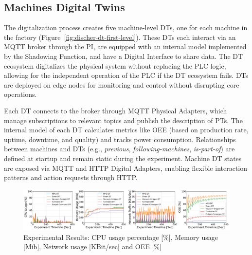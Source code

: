 


\subsection{Machines Digital Twins}
\label{subsec:dt-machine-level} 

The digitalization process creates five machine-level DTs, one for each machine in the factory (Figure~\ref{fig:discher-dt-first-level}). These DTs each interact via an MQTT broker through the PI, are equipped with an internal model implemented by the Shadowing Function, and have a Digital Interface to share data.
The DT ecosystem digitalizes the physical system without replacing the PLC logic, allowing for the independent operation of the PLC if the DT ecosystem fails.
DTs are deployed on edge nodes for monitoring and control without disrupting core operations.

Each DT connects to the broker through MQTT Physical Adapters, which manage subscriptions to relevant topics and publish the description of PTs. The internal model of each DT calculates metrics like OEE (based on production rate, uptime, downtime, and quality) and tracks power consumption. Relationships between machines and DTs (e.g., \emph{previous}, \emph{following-machines}, \emph{is-part-of}) are defined at startup and remain static during the experiment.
Machine DT states are exposed via MQTT and HTTP Digital Adapters, enabling flexible interaction patterns and action requests through HTTP.

\begin{figure}
    \setlength{\belowcaptionskip}{-13pt}
    \centering
    \includegraphics[width=\textwidth]{figures/engineering-wldt/experimental_results.pdf}
    \caption{Experimental Results: CPU usage percentage [\%], Memory usage [Mib], Network usage [KBit/sec] and OEE [\%]}
    \label{fig:exp-results}
\end{figure}

